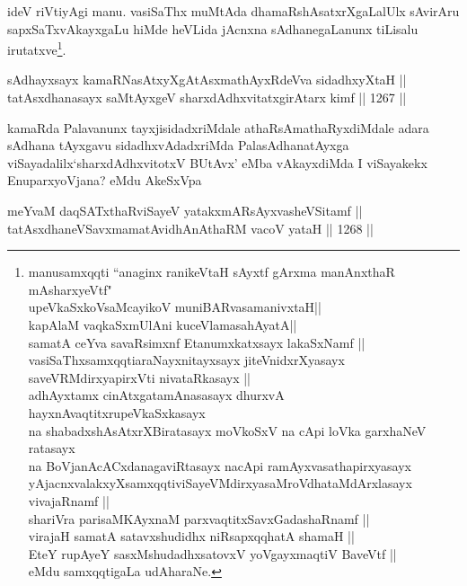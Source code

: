 \begin{artha}
ideV riVtiyAgi manu. vasiSaThx muMtAda dhamaRshAsatxrXgaLalUlx sAvirAru sapxSaTxvAkayxgaLu hiMde heVLida jAcnxna sAdhanegaLanunx tiLisalu irutatxve\footnote{manusamxqqti ``anaginx ranikeVtaH sAyxtf gArxma manAnxthaR mAsharxyeVtf"\\ upeVkaSxkoV\s saMcayikoV muniBARvasamanivxtaH||\\ kapAlaM vaqkaSxmUlAni kuceVlamasahAyatA||\\ samatA ceYva savaRsimxnf Etanumxkatxsayx lakaSxNamf ||\\ vasiSaThxsamxqqti\ndash araNayxnitayxsayx jiteVnidxrXyasayx saveVRMdirxyapirxVti nivataRkasayx ||\\ adhAyxtamx cinAtxgatamAnasasayx dhurxvA hayxnAvaqtitxrupeVkaSxkasayx \\ na shabadxshAsAtxrXBiratasayx moVkoSxV na cApi loVka garxhaNeV ratasayx\\ na BoVjanAcACxdanagaviRtasayx nacApi ramAyxvasathapirxyasayx \\ yAjacnxvalakxyXsamxqqti\ndash  viSayeVMdirxyasaMroVdhataMdArxlasayx vivajaRnamf ||\\ shariVra parisaMKAyxnaM parxvaqtitxSavxGadashaRnamf ||\\ virajaH samatA satavxshudidhx niRsapxqqhatA shamaH ||\\ EteY rupAyeY sasxMshudadhxsatovxV yoVgayxmaqtiV BaveVtf ||\\ eMdu samxqqtigaLa udAharaNe.}.
\end{artha}


\begin{shl}
sAdhayxsayx kamaRNasAtxyXgAtAsxmathAyxRdeVva sidadhxyXtaH || \\
tatAsxdhanasayx saMtAyxgeV sharxdAdhxvitatxgirA\s tarx kimf \hfill || 1267 || 
\end{shl}

\begin{artha}
kamaRda Palavanunx tayxjisidadxriMdale athaRsAmathaRyxdiMdale adara sAdhana tAyxgavu sidadhxvAdadxriMda PalasAdhanatAyxga viSayadalilx\break `sharxdAdhxvitotxV BUtAvx' eMba vAkayxdiMda I viSayakekx Enu\break parxyoVjana? eMdu AkeSxVpa
\end{artha}

\begin{shl}
meYvaM daqSATxthaRviSayeV yatakxmARsAyxvasheVSitamf || \\
tatAsxdhaneVSavxmamatAvidhAnAthaRM vacoV yataH \hfill || 1268 ||  
\end{shl}

